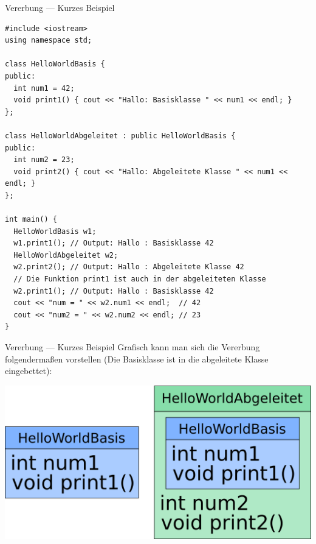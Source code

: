 \documentclass[presentation]{beamer}
\begin{document}
\begin{frame}[fragile,label={sec:org8eb3b19}]{Vererbung --- Kurzes Beispiel}
 \begin{verbatim}
#include <iostream>
using namespace std;

class HelloWorldBasis {
public:
  int num1 = 42;
  void print1() { cout << "Hallo: Basisklasse " << num1 << endl; }
};

class HelloWorldAbgeleitet : public HelloWorldBasis {
public:
  int num2 = 23;
  void print2() { cout << "Hallo: Abgeleitete Klasse " << num1 << endl; }
};

int main() {
  HelloWorldBasis w1;
  w1.print1(); // Output: Hallo : Basisklasse 42
  HelloWorldAbgeleitet w2;
  w2.print2(); // Output: Hallo : Abgeleitete Klasse 42
  // Die Funktion print1 ist auch in der abgeleiteten Klasse
  w2.print1(); // Output: Hallo : Basisklasse 42
  cout << "num = " << w2.num1 << endl;  // 42
  cout << "num2 = " << w2.num2 << endl; // 23
}
\end{verbatim}
\end{frame}
\begin{frame}[label={sec:orgae86f3e}]{Vererbung --- Kurzes Beispiel}
Grafisch kann man sich die Vererbung folgendermaßen vorstellen (Die
Basisklasse ist in die abgeleitete Klasse eingebettet):
\begin{center}\begin{center}
\includegraphics[width=.9\linewidth]{imgs/helloworldbasisabgeleitet.png}
\end{center}\end{center}
\end{frame}
\end{document}
